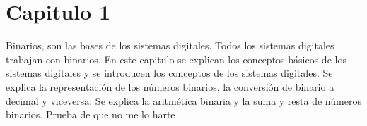 \section{Capitulo 1}
    Binarios, son las bases de los sistemas digitales. Todos los
    sistemas digitales trabajan con binarios. En este capitulo se
    explican los conceptos básicos de los sistemas digitales y se
    introducen los conceptos de los sistemas digitales. Se explica
    la representación de los números binarios, la conversión de
    binario a decimal y viceversa. Se explica la aritmética binaria
    y la suma y resta de números binarios. Prueba de que no me lo harte
        
